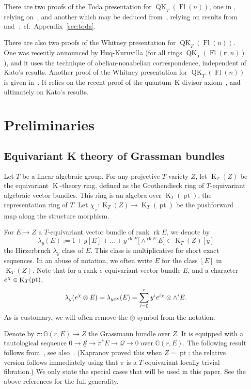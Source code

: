 \documentclass[11pt]{article}
\numberwithin{equation}{section}
\numberwithin{equation}{section}
\theoremstyle{definition}
\DeclareMathOperator{\Fl}{Fl}
\DeclareMathOperator{\QK}{QK}
\DeclareMathOperator{\K}{K}
\DeclareMathOperator{\pt}{pt}
\newcommand{\bfr}{{\mathbf r}}
\newcommand{\cQ}{{\mathcal Q}}
\newcommand{\cS}{{\mathcal S}}
\newcommand{\euler}[1]{\chi_{_{#1}}}
\begin{document}
There are two proofs of the Toda presentation for $\QK_T(\Fl(n))$, one in
\cite{maeno.naito.sagaki:QKideal}, relying on~\cite{kato:loop}, and another
which may be deduced from~\cite{act:2017}, relying on results from
\cite{givental_lee} and~\cite{Iritani:2013qka};~cf.~Appendix~\ref{sec:toda}.

There are also two proofs of the Whitney presentation for $\QK_T(\Fl(n))$.
One was recently announced by Huq-Kuruvilla
\cite{huq2024quantum} (for all rings $\QK_T(\Fl(\bfr,n))$), and
it uses the technique of abelian-nonabelian correspondence, independent
of Kato's results. Another proof of the Whitney presentation for
 $\QK_T(\Fl(n))$ is given in~\cite[Section~6]{GMSXZZ:QKW}.
It relies on the recent proof of the quantum~K divisor axiom~\cite{LNSX:QKdiv},
and ultimately on Kato's results.

\section{Preliminaries}
\subsection{Equivariant K theory of Grassman bundles}
Let $T$ be a linear algebraic group. For any projective $T$-variety $Z$,
let $\K_T(Z)$ be the equivariant $\K$-theory
ring, defined as the Grothendieck ring of $T$-equivariant algebraic vector
bundles. This ring is an algebra over $\K_T(\pt)$, the representation ring of
$T$. Let $\euler{Z}\colon \K_T(Z) \to \K_T(\pt)$ be the pushforward map along the
structure morphism.

For $E \to Z$ a $T$-equivariant
vector bundle of rank $\operatorname{rk}E$, we denote by
\[ \lambda_y(E) := 1 + y [E] + \dots + y^{\operatorname{rk}E} \bigl[\wedge^{\operatorname{rk}E} E\bigr] \in \K_T(Z)[y] \]
the Hirzerbruch $\lambda_y$ class of $E$. This class is multiplicative for short exact sequences. {In an abuse of notation, we often write $E$ for the class $[E]$ in $\K_T(Z)$.} Note that for a rank $e$ equivariant vector bundle $E$, and a character ${\rm e}^\chi \in \K_T(\pt)$,
\[ \lambda_y( {\rm e}^\chi \otimes E) = \lambda_{y {\rm e}^{\chi}}(E) = \sum_{i=0}^{e} y^i {\rm e}^{i \chi} \otimes \wedge^i E . \]
As is customary, we will often remove the $\otimes$ symbol from the notation.

Denote by
$\pi\colon \mathbb{G}(r,E) \to Z$ the Grassmann bundle over $Z$.
It is equipped with a tautological sequence
$0 \to \underline{\cS} \to \pi^* E \to \underline{\cQ} \to 0$ over
$\mathbb{G}(r,E)$. The following result follows
from~\cite[Proposition~2.2]{kapranov:Gr}, see also~\cite[Proposition~3.2 and Corollary~3.3]{gu2022quantum}.
(Kapranov proved this when $Z=\pt$; the relative version follows immediately
using that $\pi$ is a $T$-equivariant locally trivial fibration.) We only state the special cases that will be used in this paper. See the above references for the full generality.
\end{document}
